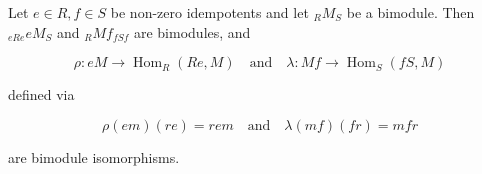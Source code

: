 Let $e \in R, f \in S$ be non-zero idempotents and let $_R M_S$ be a bimodule. Then $_{eRe} eM_S$ and $_R Mf_{fSf}$ are bimodules, and

$$\rho: eM \rightarrow \operatorname{Hom}_R(Re, M) \quad \text{and} \quad \lambda: Mf \rightarrow \operatorname{Hom}_S(fS, M)$$

defined via

$$\rho(em)(re) = rem \quad \text{and} \quad \lambda(mf)(fr) = mfr$$

are bimodule isomorphisms.
